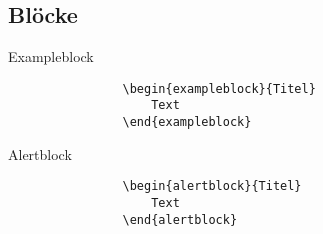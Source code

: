 	\subsection{Blöcke}
	\begin{frame}[fragile]{\subsecname}

		\begin{exampleblock}{Exampleblock}
			\begin{lstlisting}
				\begin{exampleblock}{Titel}
					Text
				\end{exampleblock}
			\end{lstlisting}
		\end{exampleblock}

		\begin{alertblock}{Alertblock}
			\begin{lstlisting}
				\begin{alertblock}{Titel}
					Text
				\end{alertblock}
			\end{lstlisting}
		\end{alertblock}

	\end{frame}
